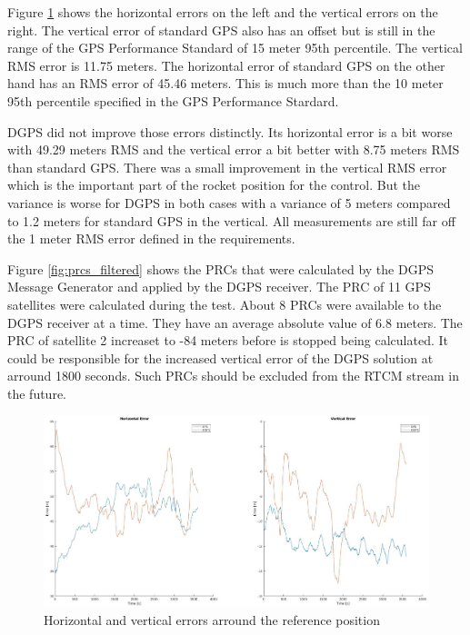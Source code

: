 Figure \ref{fig:horizontal_vertical_error} shows the horizontal errors on the left and the vertical errors on the right.
The vertical error of standard GPS also has an offset but is still in the range of the GPS Performance Standard \cite{SPS_Performance} of 15 meter 95th percentile.
The vertical RMS error is 11.75 meters.
The horizontal error of standard GPS on the other hand has an RMS error of 45.46 meters.
This is much more than the 10 meter 95th percentile specified in the GPS Performance Stardard.

DGPS did not improve those errors distinctly.
Its horizontal error is a bit worse with 49.29 meters RMS and the vertical error a bit better with 8.75 meters RMS than standard GPS.
There was a small improvement in the vertical RMS error which is the important part of the rocket position for the control.
But the variance is worse for DGPS in both cases with a variance of 5 meters compared to 1.2 meters for standard GPS in the vertical.
All measurements are still far off the 1 meter RMS error defined in the requirements.

Figure \ref{fig:prcs_filtered} shows the PRCs that were calculated by the DGPS Message Generator and applied by the DGPS receiver.
The PRC of 11 GPS satellites were calculated during the test.
About 8 PRCs were available to the DGPS receiver at a time.
They have an average absolute value of 6.8 meters.
The PRC of satellite 2 increaset to -84 meters before is stopped being calculated.
It could be responsible for the increased vertical error of the DGPS solution at arround 1800 seconds.
Such PRCs should be excluded from the RTCM stream in the future.

\begin{figure}[!h]
 \centering
 \includegraphics[height=0.4\textheight]{images/Horizontal_Vertical_Error.jpg}
 \caption{Horizontal and vertical errors arround the reference position}
 \label{fig:horizontal_vertical_error}
\end{figure}

